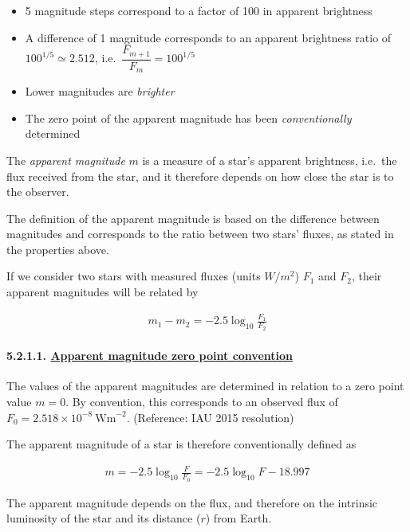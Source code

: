 \documentclass[
  letterpaper,
  DIV=11,
  numbers=noendperiod]{scrartcl}
\let\oldparagraph\paragraph
\renewcommand{\paragraph}[1]{\oldparagraph{#1}\mbox{}}
\providecommand{\tightlist}{%
  \setlength{\itemsep}{0pt}\setlength{\parskip}{0pt}}\usepackage{longtable,booktabs,array}
\begin{document}
\begin{itemize}
\tightlist
\item
  5 magnitude steps correspond to a factor of 100 in apparent brightness
\item
  A difference of 1 magnitude corresponds to an apparent brightness
  ratio of \(100^{1/5}\simeq 2.512\),
  i.e.~\(\dfrac{F_{m+1}}{F_m}=100^{1/5}\)
\item
  Lower magnitudes are \emph{brighter}
\item
  The zero point of the apparent magnitude has been
  \emph{conventionally} determined
\end{itemize}

The \emph{apparent magnitude} \(m\) is a measure of a star's apparent
brightness, i.e.~the flux received from the star, and it therefore
depends on how close the star is to the observer.

The definition of the apparent magnitude is based on the difference
between magnitudes and corresponds to the ratio between two stars'
fluxes, as stated in the properties above.

If we consider two stars with measured fluxes (units \(W/m^2\)) \(F_1\)
and \(F_2\), their apparent magnitudes will be related by

\begin{align}
m_1 - m_2 = -2.5 \log_{10} \frac{F_1}{F_2}
\end{align}

\hypertarget{apparent-magnitude-zero-point-convention}{%
\paragraph{\texorpdfstring{5.2.1.1. \protect\hyperlink{toc0_}{Apparent
magnitude zero point
convention}}{5.2.1.1. Apparent magnitude zero point convention}}\label{apparent-magnitude-zero-point-convention}}

The values of the apparent magnitudes are determined in relation to a
zero point value \(m=0\). By convention, this corresponds to an observed
flux of \(F_0 = 2.518 × 10^{−8} \ \mathrm{W m}^{−2}\). (Reference: IAU
2015 resolution)

The apparent magnitude of a star is therefore conventionally defined as

\begin{align}
m = -2.5 \log_{10}{\frac{F}{F_0}} = -2.5 \log_{10}{F} - 18.997
\end{align}

The apparent magnitude depends on the flux, and therefore on the
intrinsic luminosity of the star and its distance (\(r\)) from Earth.
\end{document}
